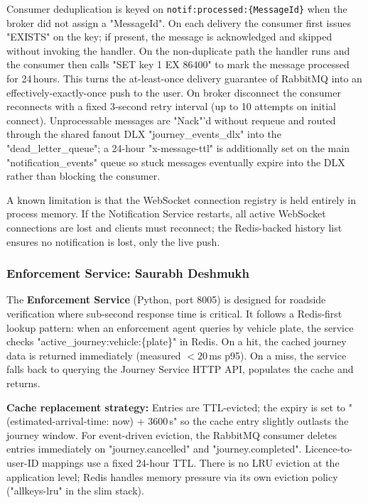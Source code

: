 \documentclass[11pt,a4paper]{article}
\begin{document}
Consumer deduplication is keyed on \texttt{notif:processed:\{MessageId\}} when the broker did not assign a "MessageId". On each delivery the consumer first issues "EXISTS" on the key; if present, the message is acknowledged and skipped without invoking the handler. On the non-duplicate path the handler runs and the consumer then calls "SET key 1 EX 86400" to mark the message processed for 24\,hours. This turns the at-least-once delivery guarantee of RabbitMQ into an effectively-exactly-once push to the user. On broker disconnect the consumer reconnects with a fixed 3-second retry interval (up to 10 attempts on initial connect). Unprocessable messages are "Nack"'d without requeue and routed through the shared fanout DLX "journey\_events\_dlx" into the "dead\_letter\_queue"; a 24-hour "x-message-ttl" is additionally set on the main "notification\_events" queue so stuck messages eventually expire into the DLX rather than blocking the consumer.

A known limitation is that the WebSocket connection registry is held entirely in process memory. If the Notification Service restarts, all active WebSocket connections are lost and clients must reconnect; the Redis-backed history list ensures no notification is lost, only the live push.
 
\subsubsection{Enforcement Service: Saurabh Deshmukh}
 
The \textbf{Enforcement Service} (Python, port 8005) is designed for roadside verification where sub-second response time is critical. It follows a Redis-first lookup pattern: when an enforcement agent queries by vehicle plate, the service checks "active\_journey:vehicle:\{plate\}" in Redis. On a hit, the cached journey data is returned immediately (measured $<20$\,ms p95). On a miss, the service falls back to querying the Journey Service HTTP API, populates the cache and returns.

\textbf{Cache replacement strategy:} Entries are TTL-evicted; the expiry is set to "(estimated-arrival-time: now) + 3600\,s" so the cache entry slightly outlasts the journey window. For event-driven eviction, the RabbitMQ consumer deletes entries immediately on "journey.cancelled" and "journey.completed". Licence-to-user-ID mappings use a fixed 24-hour TTL. There is no LRU eviction at the application level; Redis handles memory pressure via its own eviction policy ("allkeys-lru" in the slim stack).
\end{document}

